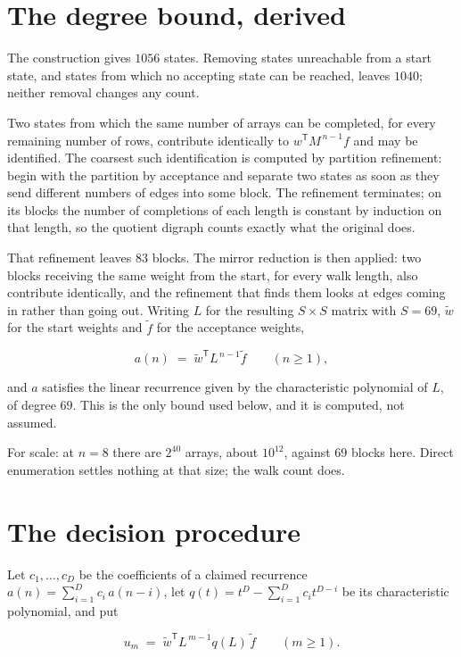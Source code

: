 \documentclass[11pt]{article}
\theoremstyle{definition}
\begin{document}
\section{The degree bound, derived}

The construction gives $1056$ states. Removing states unreachable from a start state, and states from which no accepting state can be reached, leaves $1040$; neither removal changes any count.

Two states from which the same number of arrays can be completed, for every remaining number of rows, contribute identically to $w^{\mathsf T}M^{\,n-1}f$ and may be identified. The coarsest such identification is computed by partition refinement: begin with the partition by acceptance and separate two states as soon as they send different numbers of edges into some block. The refinement terminates; on its blocks the number of completions of each length is constant by induction on that length, so the quotient digraph counts exactly what the original does.

That refinement leaves $83$ blocks. The mirror reduction is then applied: two blocks receiving the same weight from the start, for every walk length, also contribute identically, and the refinement that finds them looks at edges coming in rather than going out. Writing $L$ for the resulting $S \times S$ matrix with $S = 69$, $\tilde w$ for the start weights and $\tilde f$ for the acceptance weights,

\[a(n) \;=\; \tilde w^{\mathsf T} L^{\,n-1} \tilde f \qquad (n \ge 1),\]

and $a$ satisfies the linear recurrence given by the characteristic polynomial of $L$, of degree $69$. This is the only bound used below, and it is computed, not assumed.

For scale: at $n = 8$ there are $2^{40}$ arrays, about $10^{12}$, against $69$ blocks here. Direct enumeration settles nothing at that size; the walk count does.

\section{The decision procedure}

Let $c_1,\dots,c_D$ be the coefficients of a claimed recurrence $a(n) = \sum_{i=1}^{D} c_i\,a(n-i)$, let $q(t) = t^{D} - \sum_{i=1}^{D} c_i t^{D-i}$ be its characteristic polynomial, and put

\[u_m \;=\; \tilde w^{\mathsf T} L^{\,m-1} q(L)\,\tilde f \qquad (m \ge 1).\]
\end{document}
